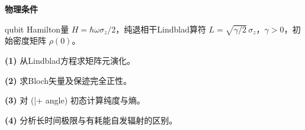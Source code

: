 \textbf{物理条件}\par qubit Hamilton量 \(H=\hbar\omega\sigma_z/2\)，纯退相干Lindblad算符 \(L=\sqrt{\gamma/2}\,\sigma_z\)，\(\gamma>0\)，初始密度矩阵 \(\rho(0)\)。
\par\noindent\textbf{(1)} 从Lindblad方程求矩阵元演化。
\par\noindent\textbf{(2)} 求Bloch矢量及保迹完全正性。
\par\noindent\textbf{(3)} 对 (|+
angle) 初态计算纯度与熵。
\par\noindent\textbf{(4)} 分析长时间极限与有耗能自发辐射的区别。

